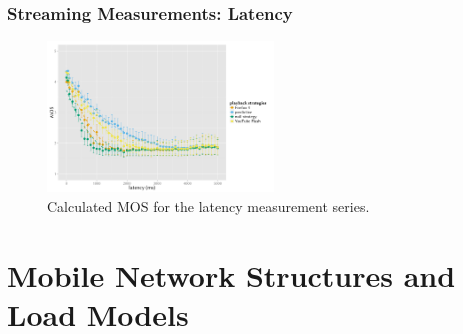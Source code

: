 \documentclass{beamer}
\begin{document}
\begin{frame}
	\frametitle{Streaming Measurements: Latency}

	\begin{figure}
		\includegraphics[height=4cm]{../../chapters/03-streaming/images/R-playbackemulation-qoe-latency.pdf}
		\caption{Calculated MOS for the latency measurement series.}
	\end{figure}


\end{frame}


\section{Mobile Network Structures and Load Models}
\end{document}

